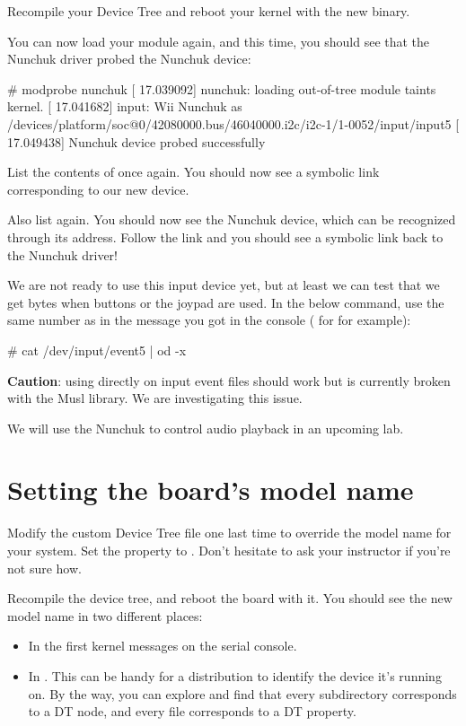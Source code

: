 {Recompile your Device Tree and reboot your kernel with the new binary.

You can now load your module again, and this time, you should see that
the Nunchuk driver probed the Nunchuk device:

\begin{bashinput}
# modprobe nunchuk
[   17.039092] nunchuk: loading out-of-tree module taints kernel.
[   17.041682] input: Wii Nunchuk as /devices/platform/soc@0/42080000.bus/46040000.i2c/i2c-1/1-0052/input/input5
[   17.049438] Nunchuk device probed successfully
\end{bashinput}

List the contents of  once again. You
should now see a symbolic link corresponding to our new device.

Also list  again. You should now see the
Nunchuk device, which can be recognized through its  address.
Follow the link and you should see a symbolic link back to the Nunchuk
driver!

We are not ready to use this input device yet, but at least we can test
that we get bytes when buttons or the joypad are used. In the below
command, use the same number as in the message you got in the console
( for  for example):

\begin{bashinput}
# cat /dev/input/event5 | od -x
\end{bashinput}

{\bf Caution}: using  directly on input event files should
work but is currently broken with the Musl library. We are investigating
this issue.

We will use the Nunchuk to control audio playback in an upcoming lab.

\section{Setting the board's model name}

Modify the custom Device Tree file one last time to override the model
name for your system. Set the  property to
. Don't hesitate to ask your
instructor if you're not sure how.

Recompile the device tree, and reboot the board with it. You should see
the new model name in two different places:

\begin{itemize}
\item In the first kernel messages on the serial console.
\item In . This can be
      handy for a distribution to identify the device it's running on.
      By the way, you can explore  and
      find that every subdirectory corresponds to a DT node, and every
      file corresponds to a DT property.
\end{itemize}

}
